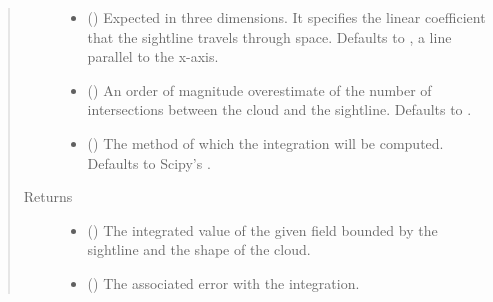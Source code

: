 \documentclass[letterpaper,10pt,english]{sphinxmanual}
\begin{document}
\begin{fulllineitems}
\begin{quote}
\begin{description}
\begin{itemize}
\item {} 
 () \textendash{} Expected in three dimensions. It specifies the linear coefficient that
the sightline travels through space. Defaults to , a line
parallel to the x-axis.

\item {} 
 () \textendash{} An order of magnitude overestimate of the number of intersections
between the cloud and the sightline. Defaults to .

\item {} 
 () \textendash{} The method of which the integration will be computed. Defaults to
Scipy’s .

\end{itemize}

\item[{Returns}] \leavevmode
\begin{itemize}
\item {} 
 () \textendash{} The integrated value of the given field bounded by the sightline and
the shape of the cloud.

\item {} 
 () \textendash{} The associated error with the integration.

\end{itemize}


\end{description}\end{quote}

\end{fulllineitems}

\end{document}
